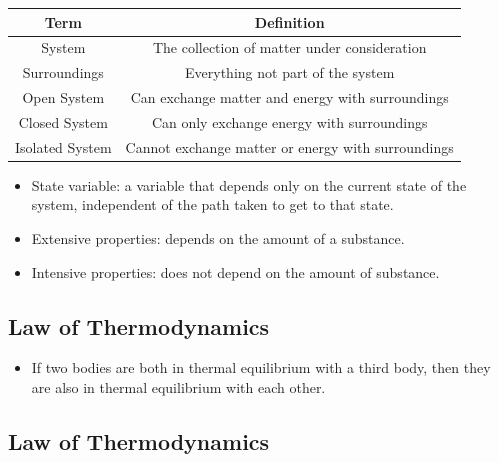 \documentclass{article}
\begin{document}
\begin{center}
    \begin{tabular}{|c|c|} 
        \hline
        \textbf{Term} & \textbf{Definition} \\
        \hline
        System & The collection of matter under consideration \\
        \hline
        Surroundings & Everything not part of the system \\
        \hline
        Open System & Can exchange matter and energy with surroundings \\
        \hline
        Closed System & Can only exchange energy with surroundings \\
        \hline
        Isolated System & Cannot exchange matter or energy with surroundings \\
        \hline
    \end{tabular}
\end{center}

\begin{itemize}
    \item State variable: a variable that depends only on the current state of the system, independent of the path taken to get to that state.
    \item Extensive properties: depends on the amount of a substance.
    \item Intensive properties: does not depend on the amount of substance.
\end{itemize}

\subsection{ Law of Thermodynamics}

\begin{itemize}
    \item If two bodies are both in thermal equilibrium with a third body, then they are also in thermal equilibrium with each other.
\end{itemize}

\subsection{ Law of Thermodynamics}
\end{document}
